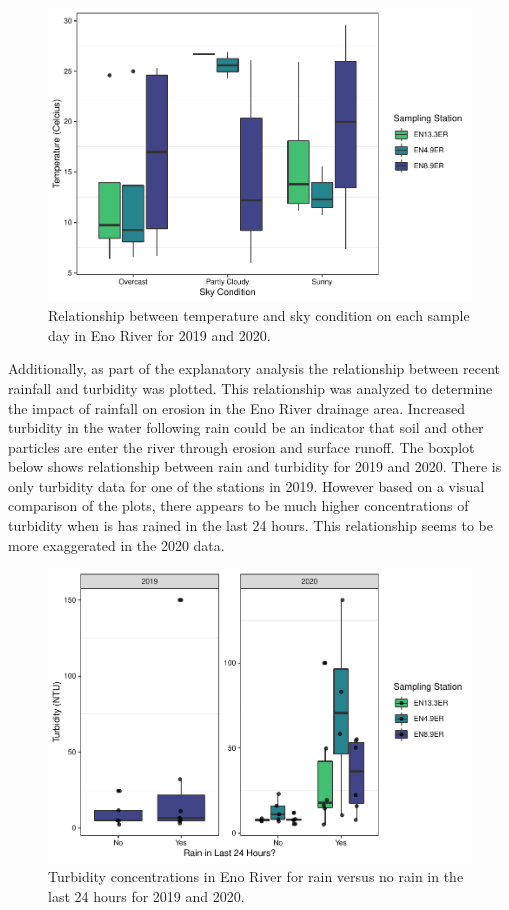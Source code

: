 \documentclass[
  12pt,
]{article}
\begin{document}
\begin{figure}
\centering
\includegraphics{August_Lindborg_ENV872_Project_files/figure-latex/unnamed-chunk-3-1.pdf}
\caption{Relationship between temperature and sky condition on each
sample day in Eno River for 2019 and 2020.}
\end{figure}

Additionally, as part of the explanatory analysis the relationship
between recent rainfall and turbidity was plotted. This relationship was
analyzed to determine the impact of rainfall on erosion in the Eno River
drainage area. Increased turbidity in the water following rain could be
an indicator that soil and other particles are enter the river through
erosion and surface runoff. The boxplot below shows relationship between
rain and turbidity for 2019 and 2020. There is only turbidity data for
one of the stations in 2019. However based on a visual comparison of the
plots, there appears to be much higher concentrations of turbidity when
is has rained in the last 24 hours. This relationship seems to be more
exaggerated in the 2020 data.

\begin{figure}
\centering
\includegraphics{August_Lindborg_ENV872_Project_files/figure-latex/unnamed-chunk-4-1.pdf}
\caption{Turbidity concentrations in Eno River for rain versus no rain
in the last 24 hours for 2019 and 2020.}
\end{figure}
\end{document}
